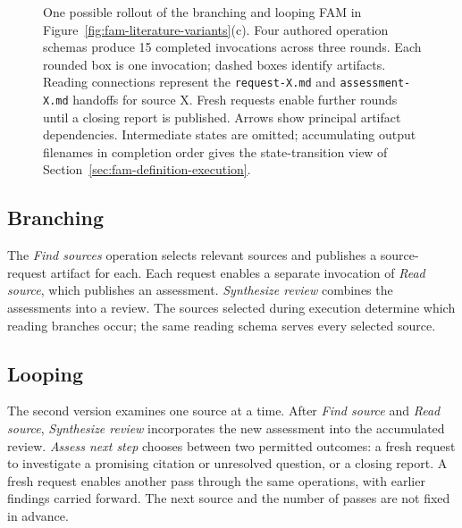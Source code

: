 \documentclass[letterpaper]{article}
\theoremstyle{definition}
\begin{document}
\begin{figure}[p]
\caption{One possible rollout of the branching and looping FAM in
Figure~\ref{fig:fam-literature-variants}(c). Four authored operation schemas
produce 15 completed invocations across three rounds. Each rounded box is
one invocation; dashed boxes identify artifacts. Reading connections
represent the \texttt{request-X.md} and \texttt{assessment-X.md} handoffs for
source X. Fresh requests enable further rounds until a closing report is
published. Arrows show principal artifact dependencies. Intermediate states
are omitted; accumulating output filenames in completion order gives the
state-transition view of Section~\ref{sec:fam-definition-execution}.}
\label{fig:fam-literature-concrete-rollout}
\end{figure}



\subsection{Branching}

The \emph{Find sources} operation selects relevant sources and publishes a
source-request artifact for each. Each request enables a separate invocation
of \emph{Read source}, which publishes an assessment. \emph{Synthesize review}
combines the assessments into a review. The sources selected during execution
determine which reading branches occur; the same reading schema serves every
selected source.

\subsection{Looping}

The second version examines one source at a time. After \emph{Find source}
and \emph{Read source}, \emph{Synthesize review} incorporates the new assessment
into the accumulated review. \emph{Assess next step} chooses between two
permitted outcomes: a fresh request to investigate a promising citation or
unresolved question, or a closing report. A fresh request enables another
pass through the same operations, with earlier findings carried forward.
The next source and the number of passes are not fixed in advance.
\end{document}
